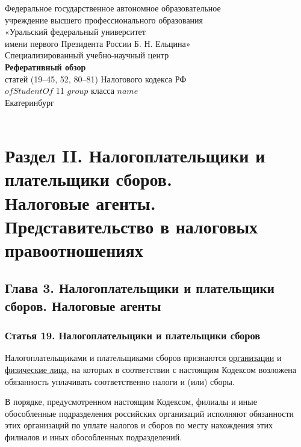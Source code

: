 \documentclass[a4page]{report}
\begin{document}
\begin{titlepage}
    \center
    \Large

    Федеральное государственное автономное образовательное\\
    учреждение высшего профессионального образования\\
    «Уральский федеральный университет\\
    имени первого Президента России Б. Н. Ельцина»\\
    Специализированный учебно-научный центр\\

    \vfill
    \textbf{Реферативный обзор}\\
    статей (19--45, 52, 80--81) Налогового кодекса РФ\\
    $ofStudentOf$ 11 $group$ класса $name$\\

    \vfill
    {Екатеринбург}\\
    {\the\year}\\
\end{titlepage}

\section{{\bf Раздел II. Налогоплательщики и плательщики сборов.}\\{\bf Налоговые агенты. Представительство в налоговых правоотношениях}}
\subsection{{\bf Глава 3. Налогоплательщики и плательщики сборов. Налоговые агенты}}
\subsubsection{{\bf Статья 19.} Налогоплательщики и плательщики сборов}
\par Налогоплательщиками и плательщиками сборов признаются \uline{организации} и \uline{физические лица}, на которых в соответствии с настоящим Кодексом возложена обязанность уплачивать соответственно налоги и (или) сборы.
\par В порядке, предусмотренном настоящим Кодексом, филиалы и иные обособленные подразделения российских организаций исполняют обязанности этих организаций по уплате налогов и сборов по месту нахождения этих филиалов и иных обособленных подразделений.
\end{document}
